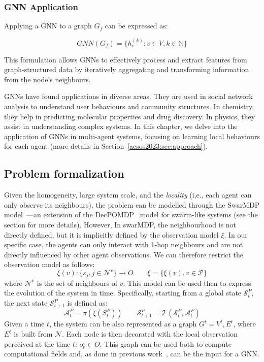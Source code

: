 \subsubsection{GNN Application}

Applying a \ac{GNN} to a graph $G_f$ can be expressed as:

\begin{equation}
\mathit{GNN}(G_f) = \{h_v^{(k)}: v \in V, k \in \mathbb{N}\}
\end{equation} 

This formulation allows \acp{GNN} to effectively process and extract features from graph-structured data by iteratively aggregating and transforming information from the node's neighbours.

\acp{GNN} have found applications in diverse areas. They are used in social network analysis to understand user behaviours and community structures. In chemistry, they help in predicting molecular properties and drug discovery. In physics, they assist in understanding complex systems. In this chapter, we delve into the application of \acp{GNN} in multi-agent systems, focusing on learning local behaviours for each agent (more details in Section~\ref{acsos2023:sec:approach}).

\subsection{Problem formalization}
Given the homogeneity, large system scale, and the \emph{locality} (i,e., each agent can only observe its neighbours), 
 the problem can be modelled through the SwarMDP model~\cite{DBLP:conf/atal/SosicKZK17}---an extension of the \ac{DecPOMDP}~\cite{Decpomdp2000} model for swarm-like systems (see the  section for more details).
% 
However, In swarMDP, the neighbourhood is not directly defined, but it is implicitly defined by the observation model $\xi$.
In our specific case, the agents can only interact with 1-hop neighbours and are not directly influenced by other agent observations. We can therefore restrict the observation model as follows:
\begin{equation*}
\xi(v): \{s_j, j \in \mathcal{N}^v\} \rightarrow O
\qquad
\xi = \{\xi(v), v \in \mathcal{P}\}
\end{equation*}
where $\mathcal{N}^v$ is the set of neighbours of $v$.
%
This model can be used then to express the evolution of the system in time.
Specifically, starting from a global state $\mathcal{S}^P_t$, the next state $\mathcal{S}^P_{t+1}$ is defined as:
\begin{equation*}
\mathcal{A}^P_t = \pi(\xi(S^P_t))
\qquad
\mathcal{S}^P_{t+1} = \mathcal{T}(\mathcal{S}^P_t, \mathcal{A}^P_t)
\end{equation*}
Given a time $t$, the system can be also represented as a graph $G^t = {V^t, E^t}$, 
  where $E^t$ is built from $\mathcal{N}$.
  Each node is then decorated with the local observation perceived at the time $t$: $o^v_t \in O$. 
%
This graph can be used both to compute computational fields and, as done in previous work~\cite{DBLP:conf/corl/TolstayaGPP0R19,tolstaya2020learning,DBLP:conf/icra/GosrichMLPYR022}, can be the input for a GNN.
